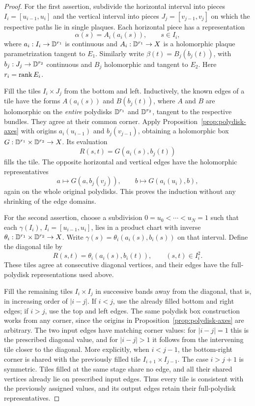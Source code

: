 \begin{proof}
For the first assertion, subdivide the horizontal interval into pieces
\(I_i=[u_{i-1},u_i]\) and the vertical interval into pieces
\(J_j=[v_{j-1},v_j]\) on which the respective paths lie in single
plaques. Each horizontal piece has a representation
\[
 \alpha(s)=A_i(a_i(s)),\qquad s\in I_i,
\]
where \(a_i:I_i\to\mathbb D^{r_1}\) is continuous and
\(A_i:\mathbb D^{r_1}\to X\) is a holomorphic plaque parametrization
tangent to \(E_1\). Similarly write
\(\beta(t)=B_j(b_j(t))\), with
\(b_j:J_j\to\mathbb D^{r_2}\) continuous and \(B_j\) holomorphic and
tangent to \(E_2\). Here \(r_i=\operatorname{rank} E_i\).

Fill the tiles \(I_i\times J_j\) from the bottom and left. Inductively,
the known edges of a tile have the forms
\(A(a_i(s))\) and \(B(b_j(t))\), where \(A\) and \(B\) are
holomorphic on the \emph{entire} polydisks \(\mathbb D^{r_1}\) and
\(\mathbb D^{r_2}\), tangent to the respective bundles. They agree at their
common corner. Apply Proposition~\ref{prop:polydisk-axes} with origins
\(a_i(u_{i-1})\) and \(b_j(v_{j-1})\), obtaining a holomorphic box
\(G:\mathbb D^{r_1}\times\mathbb D^{r_2}\to X\). Its evaluation
\[
 R(s,t)=G(a_i(s),b_j(t))
\]
fills the tile. The opposite horizontal and vertical edges have the
holomorphic representatives
\[
 a\longmapsto G(a,b_j(v_j)),\qquad
 b\longmapsto G(a_i(u_i),b),
\]
again on the whole original polydisks. This proves the induction without
any shrinking of the edge domains.

For the second assertion, choose a subdivision
\(0=u_0<\cdots<u_N=1\) such that each
\(\gamma(I_i)\), \(I_i=[u_{i-1},u_i]\), lies in a product chart
with inverse \(\theta_i:\mathbb D^{r_1}\times\mathbb D^{r_2}\to X\).
Write \(\gamma(s)=\theta_i(a_i(s),b_i(s))\) on that interval.
Define the diagonal tile by
\[
 R(s,t)=\theta_i(a_i(s),b_i(t)),\qquad (s,t)\in I_i^2.
\]
These tiles agree at consecutive diagonal vertices, and their edges have
the full-polydisk representations used above.

Fill the remaining tiles \(I_i\times I_j\) in successive bands away
from the diagonal, that is, in increasing order of \(|i-j|\).
If \(i<j\), use the already filled bottom and right
edges; if \(i>j\), use the top and left edges. The same polydisk box
construction works from any corner, since the origins in
Proposition~\ref{prop:polydisk-axes} are arbitrary. The two input edges
have matching corner values: for \(|i-j|=1\) this is the prescribed
diagonal value, and for \(|i-j|>1\) it follows from the intervening
tile closer to the diagonal. More explicitly, when \(i<j-1\), the
bottom-right corner is shared with the previously filled tile
\(I_{i+1}\times I_{j-1}\). The case \(i>j+1\) is symmetric.
Tiles filled at the same stage share no edge, and all their shared
vertices already lie on prescribed input edges. Thus every tile is
consistent with the previously assigned values, and its output edges
retain their full-polydisk representatives.


\end{proof}
